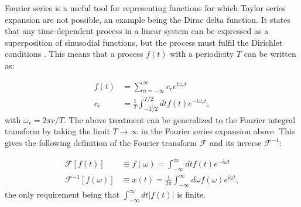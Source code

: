Fourier series is a useful tool for representing functions for which Taylor series expansion are not possible, an example being the Dirac delta function. It states that any time-dependent process in a linear system can be expressed as a superposition of sinusodial functions, but the process must fulfil the Dirichlet conditions \parencite{riley2006}. This means that a process $f(t)$ with a periodicity $T$ can be written as:

\begin{align}
f(t) & = \sum_{n = -\infty}^\infty c_r e^{i\omega_r t} \\
c_r & = \frac{1}{T}\int_{-T/2}^{T/2}dtf(t)e^{-i\omega_r t},
\end{align}
\noindent
with $\omega_r = 2\pi r/T$. The above treatment can be generalized to the Fourier integral transform by taking the limit $T \to \infty$ in the Fourier series expansion above. This gives the following definition of the Fourier transform $\mathcal{F}$ and its inverse $\mathcal{F}^{-1}$:

\begin{align}
\mathcal{F}[f(t)] & \equiv f(\omega) = \int_{-\infty}^{\infty}dtf(t)e^{-i\omega t} \\
\mathcal{F}^{-1}[f(\omega)] & \equiv x(t) =\frac{1}{2\pi} \int_{-\infty}^{\infty}d\omega f(\omega)e^{i\omega t},
\end{align}
\noindent
the only requirement being that $\int_{-\infty}^{\infty}dt\left|f(t)\right|$ is finite.